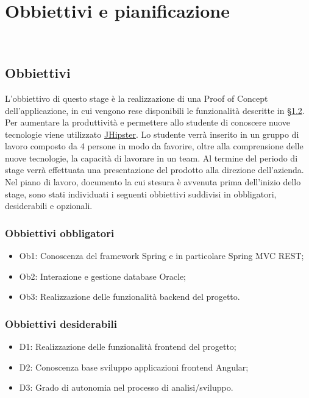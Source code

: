 
\chapter{Obbiettivi e pianificazione}
\label{cap:obbiettivi-pianificazione}

\\

\section{Obbiettivi}
L'obbiettivo di questo stage è la realizzazione di una Proof of Concept dell'applicazione, in cui vengono rese disponibili le funzionalità descritte in \hyperref[sez:scopo]{§1.2}. Per aumentare la produttività e permettere allo studente di conoscere nuove tecnologie viene utilizzato \hyperref[jhi]{JHipster}. Lo studente verrà inserito in un gruppo di lavoro composto da 4 persone in modo da favorire, oltre alla comprensione delle nuove tecnologie, la capacità di lavorare in un team.
Al termine del periodo di stage verrà effettuata una presentazione del prodotto alla direzione dell'azienda.
\\Nel piano di lavoro, documento la cui stesura è avvenuta prima dell'inizio dello stage, sono stati individuati i seguenti obbiettivi suddivisi in obbligatori, desiderabili e opzionali.
\subsection{Obbiettivi obbligatori}
\begin{itemize}
    \item Ob1: Conoscenza del framework Spring e in particolare Spring MVC REST;
    \item Ob2: Interazione e gestione database Oracle;
    \item Ob3: Realizzazione delle funzionalità backend del progetto.
\end{itemize}
\subsection{Obbiettivi desiderabili}
\begin{itemize}
    \item D1: Realizzazione delle funzionalità frontend del progetto;
    \item D2: Conoscenza base sviluppo applicazioni frontend Angular;
    \item D3: Grado di autonomia nel processo di analisi/sviluppo.
\end{itemize}
